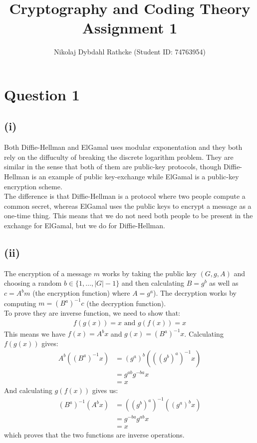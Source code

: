 \documentclass[a4paper, fleqn]{article}
\author{Nikolaj Dybdahl Rathcke (Student ID: 74763954)}
\title{Cryptography and Coding Theory \\ Assignment 1}
\begin{document}
\maketitle

\section{Question 1}
\subsection{(i)}
Both Diffie-Hellman and ElGamal uses modular exponentation and they both rely on the diffuculty of breaking the discrete logarithm problem. They are similar in the sense that both of them are public-key protocols, though Diffie-Hellman is an example of public key-exchange while ElGamal is a public-key encryption scheme. \\
The difference is that Diffie-Hellman is a protocol where two people compute a common secret, whereas ElGamal uses the public keys to encrypt a message as a one-time thing. This means that we do not need both people to be present in the exchange for ElGamal, but we do for Diffie-Hellman.

\subsection{(ii)}
The encryption of a message $m$ works by taking the public key $(G, g, A)$ and choosing a random $b\in \{1,\ldots, |G|-1\}$ and then calculating $B=g^b$ as well as $c=A^bm$ (the encryption function) where $A=g^a$). The decryption works by computing $m=(B^a)^{-1}c$ (the decryption function). \\
To prove they are inverse function, we need to show that:
\begin{align*}
  f(g(x))=x \mbox{ and } g(f(x))=x
\end{align*}
This means we have $f(x)=A^bx$ and $g(x)=(B^a)^{-1}x$. Calculating $f(g(x))$ gives:
\begin{align*}
  A^b((B^a)^{-1}x) &= (g^a)^b(((g^b)^a)^{-1}x) \\
                   &= g^{ab}g^{-ba}x \\
                   &= x
\end{align*}
And calculating $g(f(x))$ gives us:
\begin{align*}
  (B^a)^{-1}(A^bx) &= ((g^b)^a)^{-1}((g^a)^bx) \\
                   &= g^{-ba}g^{ab}x \\
                   &= x
\end{align*}
which proves that the two functions are inverse operations.
\end{document}
